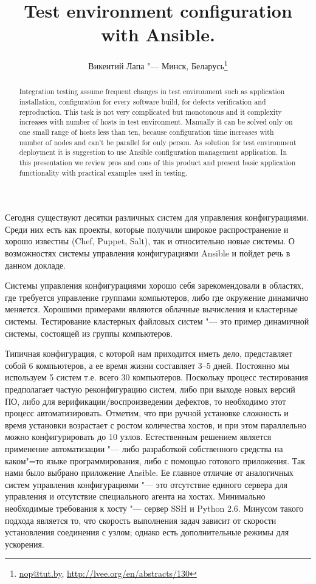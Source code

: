 \documentclass[10pt, a5paper]{article}
\begin{document}
\title{Test environment configuration with Ansible. }
\author{Викентий Лапа "--- Минск, Беларусь\footnote{\url{nop@tut.by}, \url{http://lvee.org/en/abstracts/130}}}
\maketitle
\begin{abstract}
Integration testing assume frequent changes in test environment such as application installation, configuration for every software build, for defects verification and reproduction. This task is not very complicated but monotonous and it complexity increases with number of hosts in test environment. Manually it can be solved only on one small range of hosts less than ten, because configuration time increases with number of nodes and can't be parallel for only person. As solution for test environment deployment it is suggestion to use Ansible configuration management application. In this presentation we review pros and cons of this product and present basic application functionality with practical examples used in testing. 
\end{abstract}
Сегодня существуют десятки различных систем для управления конфигурациями. Среди них есть как проекты, которые получили широкое распространение и хорошо известны (Chef, Puppet, Salt), так и относительно новые системы. О возможностях системы управления конфигурациями Ansible и пойдет речь в данном докладе.

Системы управления конфигурациями хорошо себя зарекомендовали в областях, где требуется управление группами компьютеров, либо где окружение динамично меняется. Хорошими примерами являются облачные вычисления и кластерные системы. Тестирование кластерных файловых систем "--- это пример динамичной системы, состоящей из группы компьютеров.

Типичная конфигурация, с которой нам приходится иметь дело, представляет собой 6 компьютеров, а ее время жизни составляет 3--5 дней. Постоянно мы используем 5 систем т.е. всего 30 компьютеров. Поскольку процесс тестирования предполагает частую реконфигурацию систем, либо при выходе новых версий ПО, либо для верификации/воспроизведении дефектов, то необходимо этот процесс автоматизировать. Отметим, что при ручной установке сложность и время установки возрастает с ростом количества хостов, и при этом параллельно можно конфигурировать до 10 узлов. Естественным решением является применение автоматизации "--- либо разработкой собственного средства на каком"=то языке программирования, либо с помощью готового приложения. Так нами было выбрано приложение Ansible. Ее главное отличие от аналогичных систем управления конфигурациями "--- это отсутствие единого сервера для управления и отсутствие специального агента на хостах. Минимально необходимые требования к хосту "--- сервер SSH и Python 2.6. Минусом такого подхода является то, что скорость выполнения задач зависит от скорости установления соединения с узлом; однако есть дополнительные режимы для ускорения.
\end{document}
